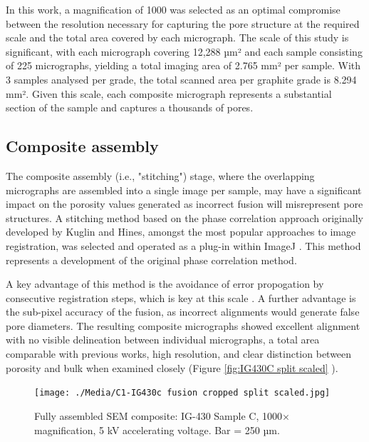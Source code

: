 \documentclass[3p,twocolumn]{elsarticle}
\begin{document}
In this work, a magnification of 1000 was selected as an optimal compromise
between the resolution necessary for capturing the pore structure at the
required scale and the total area covered by each micrograph. The scale of this
study is significant, with each micrograph covering 12,288 µm² and each sample
consisting of 225 micrographs, yielding a total imaging area of 2.765 mm² per
sample. With 3 samples analysed per grade, the total scanned area per graphite grade is
8.294 mm². Given this scale, each composite micrograph represents a substantial
section of the sample and captures a thousands of pores.

\subsection{Composite assembly}

The composite assembly (i.e., "stitching") stage, where the overlapping
micrographs are assembled into a single image per sample, may have a significant
impact on the porosity values generated as incorrect fusion will misrepresent
pore structures. A stitching method based on the phase correlation approach
originally developed by Kuglin and Hines, amongst the most popular approaches to
image registration, was selected and operated as a plug-in within ImageJ
\citep{Kuglin1975, Preibisch2009}. This method represents a development of the
original phase correlation method\citep{Preibisch2009}.
	
A key advantage of this method is the avoidance of error propogation by
consecutive registration steps, which is key at this scale
\citep{Preibisch2009}. A further advantage is the sub-pixel accuracy of the
fusion, as incorrect alignments would generate false pore diameters. The
resulting composite micrographs showed excellent alignment with no visible
delineation between individual micrographs, a total area comparable with
previous works, high resolution, and clear distinction
between porosity and bulk when examined closely (Figure \ref{fig:IG430C split
scaled} \cite{Huang2019,Kane2011a}). 

	\begin{figure}
		\centering
		\texttt{[image: ./Media/C1-IG430c fusion cropped split scaled.jpg]}
		\caption{Fully assembled SEM composite: IG-430 Sample C, 1000×  magnification,
     5 kV accelerating voltage. Bar = 250 µm.}
		\label{fig:IG430C split scaled}
	\end{figure} 
\end{document}
